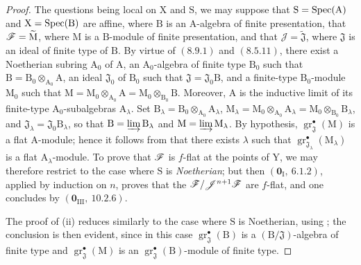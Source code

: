 \begin{proof}
The questions being local on $\mathrm{X}$ and $\mathrm{S}$, we may suppose that
$\mathrm{S}=\operatorname{Spec}(\mathrm{A})$ and $\mathrm{X}=\operatorname{Spec}(\mathrm{B})$ are affine,
where $\mathrm{B}$ is an $\mathrm{A}$-algebra of finite presentation, that
$\mathscr{F}=\widetilde{\mathrm{M}}$, where $\mathrm{M}$ is a
$\mathrm{B}$-module of finite presentation, and that
$\mathscr{J}=\widetilde{\mathfrak{J}}$, where $\mathfrak{J}$ is an ideal
of finite type of $\mathrm{B}$. By virtue of $(8.9.1)$ and $(8.5.11)$,
there exist a Noetherian subring $\mathrm{A}_0$ of $\mathrm{A}$, an
$\mathrm{A}_0$-algebra of finite type $\mathrm{B}_0$ such that
$\mathrm{B}=\mathrm{B}_0\otimes_{\mathrm{A}_0}\mathrm{A}$, an ideal
$\mathfrak{J}_0$ of $\mathrm{B}_0$ such that
$\mathfrak{J}=\mathfrak{J}_0\mathrm{B}$, and a finite-type
$\mathrm{B}_0$-module $\mathrm{M}_0$ such that
$\mathrm{M}=\mathrm{M}_0\otimes_{\mathrm{A}_0}\mathrm{A}
=\mathrm{M}_0\otimes_{\mathrm{B}_0}\mathrm{B}$. Moreover,
$\mathrm{A}$ is the inductive limit of its finite-type
$\mathrm{A}_0$-subalgebras $\mathrm{A}_\lambda$. Set
$\mathrm{B}_\lambda=\mathrm{B}_0\otimes_{\mathrm{A}_0}\mathrm{A}_\lambda$,
$\mathrm{M}_\lambda=\mathrm{M}_0\otimes_{\mathrm{A}_0}\mathrm{A}_\lambda
=\mathrm{M}_0\otimes_{\mathrm{B}_0}\mathrm{B}_\lambda$, and
$\mathfrak{J}_\lambda=\mathfrak{J}_0\mathrm{B}_\lambda$, so that
$\mathrm{B}=\varinjlim\mathrm{B}_\lambda$ and
$\mathrm{M}=\varinjlim\mathrm{M}_\lambda$. By hypothesis,
$\operatorname{gr}^\bullet_\mathfrak{J}(\mathrm{M})$ is a flat
$\mathrm{A}$-module; hence it follows from  that there
exists $\lambda$ such that
$\operatorname{gr}^\bullet_{\mathfrak{J}_\lambda}(\mathrm{M}_\lambda)$ is a
flat $\mathrm{A}_\lambda$-module. To prove that $\mathscr{F}$ is $f$-flat at
the points of $\mathrm{Y}$, we may therefore restrict to the case where
$\mathrm{S}$ is \emph{Noetherian}; but then $(\mathbf{0}_\mathrm{I},~6.1.2)$,
applied by induction on $n$, proves that the
$\mathscr{F}/\mathscr{J}^{n+1}\mathscr{F}$ are $f$-flat, and one concludes by
$(\mathbf{0}_{\mathrm{III}},~10.2.6)$.

The proof of (ii) reduces similarly to the case where $\mathrm{S}$ is Noetherian, using ; the conclusion is then evident, since in this case $\operatorname{gr}^\bullet_\mathfrak{J}(\mathrm{B})$ is a $(\mathrm{B}/\mathfrak{J})$-algebra of finite type and $\operatorname{gr}^\bullet_\mathfrak{J}(\mathrm{M})$ is an $\operatorname{gr}^\bullet_\mathfrak{J}(\mathrm{B})$-module of finite type.


\end{proof}
